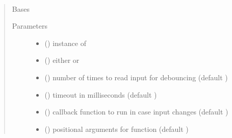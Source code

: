 \documentclass[letterpaper,10pt,english]{sphinxmanual}
\begin{document}

\begin{fulllineitems}
\label{\detokenize{index:rcpy.button.ButtonEvent}}~\begin{quote}\begin{description}
\item[{Bases}] \leavevmode
{\hyperref[\detokenize{index:rcpy.gpio.InputEvent}]{}}

\item[{Parameters}] \leavevmode\begin{itemize}
\item {} 
 () \textendash{} instance of {\hyperref[\detokenize{index:rcpy.gpio.Input}]{}}

\item {} 
 () \textendash{} either {\hyperref[\detokenize{index:rcpy.button.ButtonEvent.PRESSED}]{}} or {\hyperref[\detokenize{index:rcpy.button.ButtonEvent.RELEASED}]{}}

\item {} 
 () \textendash{} number of times to read input for debouncing (default )

\item {} 
 () \textendash{} timeout in milliseconds (default )

\item {} 
 () \textendash{} callback function to run in case input changes (default )

\item {} 
 () \textendash{} positional arguments for function  (default \sphinxtitleref{()})


\end{itemize}
\end{description}
\end{quote}
\end{fulllineitems}
\end{document}
